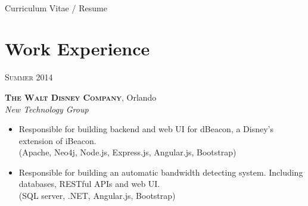 \documentclass[10pt]{article}
\begin{document}
\color{text1} %


\par{\\[8pt] %
{\color{headings} Curriculum {Vitae / Resume}\\[15pt]\par} %
	

\begin{minipage}[t]{0.5\textwidth} %
\vspace{0pt} %
	

\section{Work Experience} 


{\raggedleft\textsc{Summer 2014}\par}

{\raggedright\large \textbf{\textsc{The Walt Disney Company}}, Orlando\\
\textit{New Technology Group}\\[5pt]}

\begin{itemize}
	\item Responsible for building backend and web UI for dBeacon, a Disney's extension of iBeacon. \\
	(Apache, Neo4j, Node.js, Express.js, Angular.js, Bootstrap)
	\item Responsible for building an automatic bandwidth detecting system. Including databases, RESTful APIs and web UI. \\
	(SQL server, .NET, Angular.js, Bootstrap)
\end{itemize}


\end{minipage}}
\end{document}
